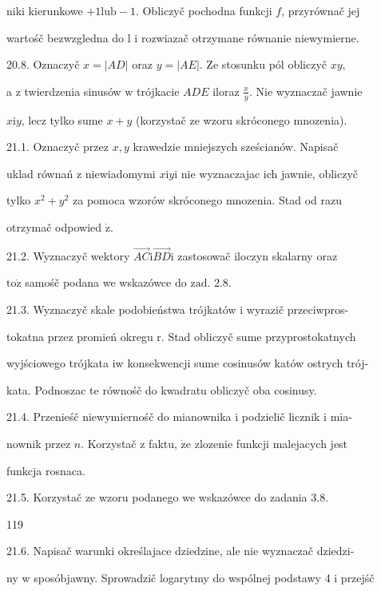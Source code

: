 \documentclass[a4paper,12pt]{article}
\begin{document}
niki kierunkowe $+1\mathrm{l}\mathrm{u}\mathrm{b}-1$. Obliczyč pochodna funkcji $f$, przyrównač jej

wartośč bezwzgledna do l $\mathrm{i}$ rozwiazač otrzymane równanie niewymierne.

20.8. Oznaczyč $x=|AD|$ oraz $y=|AE|$. Ze stosunku pól obliczyč $xy,$

a $\mathrm{z}$ twierdzenia sinusów $\mathrm{w}$ trójkacie $ADE$ iloraz $\displaystyle \frac{x}{y}$. Nie wyznaczač jawnie

$x\mathrm{i}y$, lecz tylko sume $x+y$ (korzystač ze wzoru skróconego mnozenia).

21.1. Oznaczyč przez $x, y$ krawedzie mniejszych sześcianów. Napisač

uklad równań $\mathrm{z}$ niewiadomymi $x\mathrm{i}y\mathrm{i}$ nie wyznaczajac ich jawnie, obliczyč

tylko $x^{2} +y^{2}$ za pomoca wzorów skróconego mnozenia. Stad od razu

otrzymač odpowied $\acute{\mathrm{z}}.$

21.2. Wyznaczyč wektory $\vec{AC}\mathrm{i}\vec{BD}\mathrm{i}$ zastosowač iloczyn skalarny oraz

$\mathrm{t}\mathrm{o}\dot{\mathrm{z}}$ samośč podana we wskazówce do $\mathrm{z}\mathrm{a}\mathrm{d}$. 2.8.

21.3. Wyznaczyč skale podobieństwa trójkatów i wyrazič przeciwpros-

tokatna przez promień okregu r. Stad obliczyč sume przyprostokatnych

wyjściowego trójkata iw konsekwencji sume cosinusów katów ostrych trój-

kata. Podnoszac te równośč do kwadratu obliczyč oba cosinusy.

21.4. Przenieśč niewymiernośč do mianownika $\mathrm{i}$ podzielič licznik $\mathrm{i}$ mia-

nownik przez $n$. Korzystač $\mathrm{z}$ faktu, $\dot{\mathrm{z}}\mathrm{e}$ zlozenie funkcji malejacych jest

funkcja rosnaca.

21.5. Korzystač ze wzoru podanego we wskazówce do zadania 3.8.





119

21.6. Napisač warunki określajace dziedzine, ale nie wyznaczač dziedzi-

ny w sposóbjawny. Sprowadzič logarytmy do wspólnej podstawy 4 i przejśč
\end{document}

